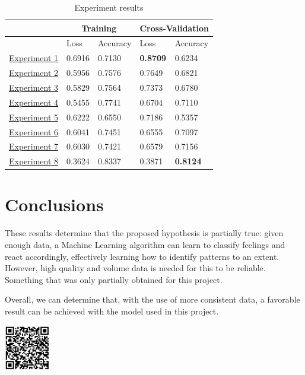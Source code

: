 \documentclass[a4]{sciposter}
\begin{document}
\begin{multicols}{3}
\begin{table}[!h]
	\captionsetup{type=table}
	\setcounter{table}{1}
	\caption{Experiment results}
	\vspace{0.5cm}
	\centering
	\begin{tabular}[t]{|l|l|l|l|l|}
	\hline
	\multicolumn{1}{|c|}{} & \multicolumn{2}{c|}{Training} & \multicolumn{2}{c|}{Cross-Validation}
	\\ \hline
	\ & Loss & Accuracy & Loss & Accuracy
	\\ \hline
	\hyperref[exp1]{Experiment 1} & 0.6916 & 0.7130 & \textbf{0.8709} & 0.6234
	\\ \hline
	\hyperref[exp2]{Experiment 2} & 0.5956 & 0.7576 & 0.7649 & 0.6821
	\\ \hline
	\hyperref[exp3]{Experiment 3} & 0.5829 & 0.7564 & 0.7373 & 0.6780
	\\ \hline
	\hyperref[exp4]{Experiment 4} & 0.5455 & 0.7741 & 0.6704 & 0.7110
	\\ \hline
	\hyperref[exp6]{Experiment 5} & 0.6222 & 0.6550 & 0.7186 & 0.5357
	\\ \hline
	\hyperref[exp7]{Experiment 6} & 0.6041 & 0.7451 & 0.6555 & 0.7097
	\\ \hline
	\hyperref[exp8]{Experiment 7} & 0.6030 & 0.7421 & 0.6579 & 0.7156
	\\ \hline
	\hyperref[exp9]{Experiment 8} & 0.3624 & 0.8337 & 0.3871 & \textbf{0.8124}
	\\ \hline
	\end{tabular}
\end{table}

\section{Conclusions}

These results determine that the proposed hypothesis is partially true: given enough data, a Machine Learning algorithm can learn to classify feelings and react accordingly, effectively learning how to identify patterns to an extent. However, high quality and volume data is needed for this to be reliable. Something that was only partially obtained for this project.

Overall, we can determine that, with the use of more consistent data, a favorable result can be achieved with the model used in this project.




\hspace*{120mm}\includegraphics[width=0.15\textwidth]{qrcode.png}

\end{multicols}
\end{document}
